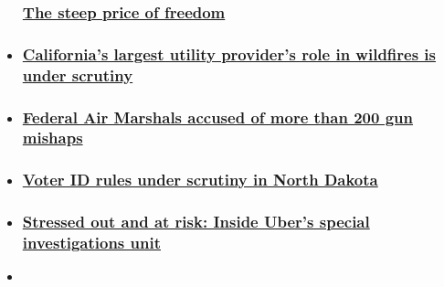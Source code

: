 \begin{itemize}
{  \subsubsection{\texorpdfstring{\href{/videos/us/2019/08/29/bail-bonds-industry-reform-investigation-drew-griffin-lead-vpx.cnn}{The
  steep price of
  freedom}}{The steep price of freedom}}\label{the-steep-price-of-freedom}}
\item
  \hypertarget{californias-largest-utility-providers-role-in-wildfires-is-under-scrutiny}{%
  \subsubsection{\texorpdfstring{\href{/2018/12/19/us/camp-fire-pge-invs/index.html}{California's
  largest utility provider's role in wildfires is under
  scrutiny}}{California's largest utility provider's role in wildfires is under scrutiny}}\label{californias-largest-utility-providers-role-in-wildfires-is-under-scrutiny}}
\item
  \hypertarget{federal-air-marshals-accused-of-more-than-200-gun-mishaps}{%
  \subsubsection{\texorpdfstring{\href{/2018/11/19/us/air-marshal-guns-invs/index.html}{Federal
  Air Marshals accused of more than 200 gun
  mishaps}}{Federal Air Marshals accused of more than 200 gun mishaps}}\label{federal-air-marshals-accused-of-more-than-200-gun-mishaps}}
\item
  \hypertarget{voter-id-rules-under-scrutiny-in-north-dakota}{%
  \subsubsection{\texorpdfstring{\href{/videos/politics/2018/10/18/north-dakota-voter-identification-rules-griffin-dnt-ac-vpx.cnn}{Voter
  ID rules under scrutiny in North
  Dakota}}{Voter ID rules under scrutiny in North Dakota}}\label{voter-id-rules-under-scrutiny-in-north-dakota}}
\item
  \hypertarget{stressed-out-and-at-risk-inside-ubers-special-investigations-unit}{%
  \subsubsection{\texorpdfstring{\href{/2019/01/21/tech/uber-investigations-unit-report/index.html}{Stressed
  out and at risk: Inside Uber's special investigations
  unit}}{Stressed out and at risk: Inside Uber's special investigations unit}}\label{stressed-out-and-at-risk-inside-ubers-special-investigations-unit}}
\item
  \hypertarget{epa-interim-chief-lobbied-for-company-seeking-epa-contracts}{%
}
\end{itemize}
